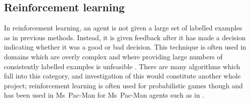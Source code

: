 \subsection{Reinforcement learning}

In reinforcement learning, an agent is not given a large set of labelled examples as in previous methods.  Instead, it is given feedback after it has made a decision indicating whether it was a good or bad decision.  This technique is often used in domains which are overly complex and where providing large numbers of consistently labelled examples is unfeasible \citep[p. 831]{RussellNorvig}.  There are many algorithms which fall into this category, and investigation of this would constitute another whole project; reinforcement learning is often used for probabilistic games though and has been used in Ms~Pac-Man for Ms~Pac-Man agents such as in \citet{Szita2007}.



